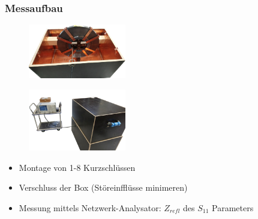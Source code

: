 \documentclass[accentcolor=tud9b, colorbacktitle, inverttitle]{tudbeamer}
\begin{document}
\begin{frame}\frametitle{Messaufbau}
\vspace{-1em}
\begin{multicols}{2}
	\begin{figure}[h]
		\centering
		\includegraphics[width=0.38\textwidth]{BoxKreuzPolygonRK8Ks}
	\end{figure}
	\begin{figure}[h]
		\centering
		\includegraphics[width=0.38\textwidth]{messstand}
	\end{figure}
	\vfill\null
	\columnbreak
	\begin{itemize}
		\item Montage von 1-8 Kurzschl\"ussen
		\item Verschluss der Box (St\"oreinffl\"usse minimeren)
		\item Messung mittels Netzwerk-Analysator: $Z_{refl}$ des $S_{11}$ Parameters
	\end{itemize}
\end{multicols}
\end{frame}
\end{document}
